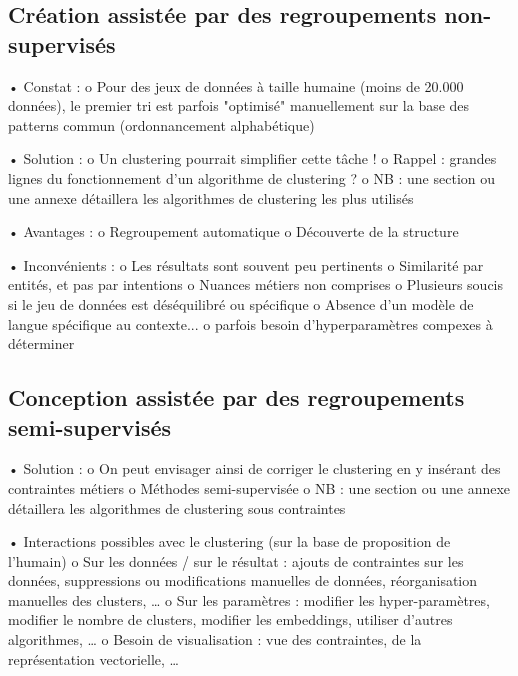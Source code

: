         \subsection{Création assistée par des regroupements non-supervisés}

            •	Constat :
                o	Pour des jeux de données à taille humaine (moins de 20.000 données), le premier tri est parfois "optimisé" manuellement sur la base des patterns commun (ordonnancement alphabétique)

            •	Solution :
                o	Un clustering pourrait simplifier cette tâche !
                o   Rappel : grandes lignes du fonctionnement d'un algorithme de clustering ?
                o	NB : une section ou une annexe détaillera les algorithmes de clustering les plus utilisés

            •	Avantages :
                o	Regroupement automatique
                o	Découverte de la structure

            •	Inconvénients :
                o	Les résultats sont souvent peu pertinents
                o	Similarité par entités, et pas par intentions
                o	Nuances métiers non comprises
                o	Plusieurs soucis si le jeu de données est déséquilibré ou spécifique
                o	Absence d’un modèle de langue spécifique au contexte...
                o   parfois besoin d'hyperparamètres compexes à déterminer

        \subsection{Conception assistée par des regroupements semi-supervisés}

            •	Solution :
                o	On peut envisager ainsi de corriger le clustering en y insérant des contraintes métiers \cite{lampert:2018}
                o	Méthodes semi-supervisée
                o	NB : une section ou une annexe détaillera les algorithmes de clustering sous contraintes

            •   Interactions possibles avec le clustering (sur la base de proposition de l'humain)
                o	Sur les données / sur le résultat : ajouts de contraintes sur les données, suppressions ou modifications manuelles de données, réorganisation manuelles des clusters, …
                o	Sur les paramètres : modifier les hyper-paramètres, modifier le nombre de clusters, modifier les embeddings, utiliser d’autres algorithmes, …
                o	Besoin de visualisation : vue des contraintes, de la représentation vectorielle, …

